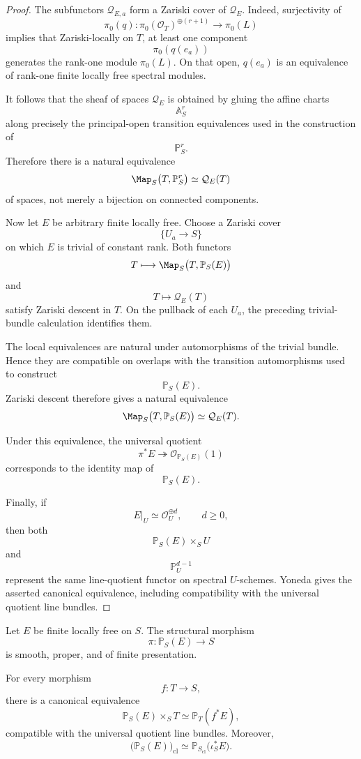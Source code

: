 \begin{proof}
The subfunctors \(\mathcal Q_{E,a}\) form a Zariski cover of
\(\mathcal Q_E\).  Indeed, surjectivity of
\[
    \pi_0(q):
    \pi_0(\mathcal O_T)^{\oplus(r+1)}
    \longrightarrow
    \pi_0(L)
\]
implies that Zariski-locally on \(T\), at least one component
\[
    \pi_0(q(e_a))
\]
generates the rank-one module \(\pi_0(L)\).  On that open, \(q(e_a)\) is an
equivalence of rank-one finite locally free spectral modules.

It follows that the sheaf of spaces \(\mathcal Q_E\) is obtained by gluing
the affine charts
\[
    \mathbb A^r_S
\]
along precisely the principal-open transition equivalences used in the
construction of
\[
    \mathbb P^r_S.
\]
Therefore there is a natural equivalence
\[
    \Map_S
    \bigl(
      T,
      \mathbb P^r_S
    \bigr)
    \simeq
    \mathcal Q_E(T)
\]
of spaces, not merely a bijection on connected components.

Now let \(E\) be arbitrary finite locally free.  Choose a Zariski cover
\[
    \{U_a\longrightarrow S\}
\]
on which \(E\) is trivial of constant rank.  Both functors
\[
    T\longmapsto
    \Map_S
    \bigl(
      T,
      \mathbb P_S(E)
    \bigr)
\]
and
\[
    T\longmapsto
    \mathcal Q_E(T)
\]
satisfy Zariski descent in \(T\).  On the pullback of each \(U_a\), the
preceding trivial-bundle calculation identifies them.

The local equivalences are natural under automorphisms of the trivial
bundle.  Hence they are compatible on overlaps with the transition
automorphisms used to construct
\[
    \mathbb P_S(E).
\]
Zariski descent therefore gives a natural equivalence
\[
    \Map_S
    \bigl(
      T,
      \mathbb P_S(E)
    \bigr)
    \simeq
    \mathcal Q_E(T).
\]

Under this equivalence, the universal quotient
\[
    \pi^*E
    \twoheadrightarrow
    \mathcal O_{\mathbb P_S(E)}(1)
\]
corresponds to the identity map of
\[
    \mathbb P_S(E).
\]

Finally, if
\[
    E|_U
    \simeq
    \mathcal O_U^{\oplus d},
    \qquad
    d\geq0,
\]
then both
\[
    \mathbb P_S(E)\times_SU
\]
and
\[
    \mathbb P^{d-1}_U
\]
represent the same line-quotient functor on spectral \(U\)-schemes.
Yoneda gives the asserted canonical equivalence, including compatibility
with the universal quotient line bundles.
\end{proof}

\begin{proposition}
\label{prop:projective-bundle-geometry}
Let \(E\) be finite locally free on \(S\).  The structural morphism
\[
    \pi:\mathbb P_S(E)\longrightarrow S
\]
is smooth, proper, and of finite presentation.

For every morphism
\[
    f:T\longrightarrow S,
\]
there is a canonical equivalence
\[
    \mathbb P_S(E)\times_ST
    \simeq
    \mathbb P_T(f^*E),
\]
compatible with the universal quotient line bundles.  Moreover,
\[
    \bigl(\mathbb P_S(E)\bigr)_{\mathrm{cl}}
    \simeq
    \mathbb P_{S_{\mathrm{cl}}}
    \bigl(
      \iota_S^*E
    \bigr).
\]
\end{proposition}

